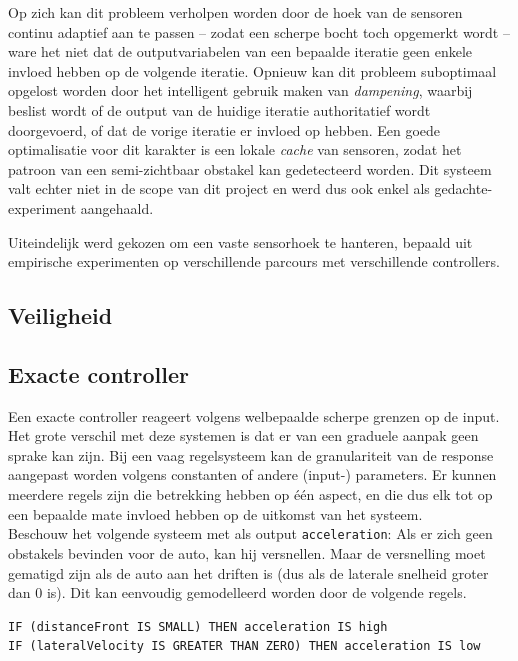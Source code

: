 \documentclass[10pt,a4paper]{article}
\begin{document}
			Op zich kan dit probleem verholpen worden door de hoek van de sensoren continu adaptief aan te passen -- zodat een scherpe bocht toch opgemerkt wordt -- ware het niet dat de outputvariabelen van een bepaalde iteratie geen enkele invloed hebben op de volgende iteratie. Opnieuw kan dit probleem suboptimaal opgelost worden door het intelligent gebruik maken van \textit{dampening}, waarbij beslist wordt of de output van de huidige iteratie authoritatief wordt doorgevoerd, of dat de vorige iteratie er invloed op hebben. Een goede optimalisatie voor dit karakter is een lokale \textit{cache} van sensoren, zodat het patroon van een semi-zichtbaar obstakel kan gedetecteerd worden. Dit systeem valt echter niet in de scope van dit project en werd dus ook enkel als gedachte-experiment aangehaald.

			Uiteindelijk werd gekozen om een vaste sensorhoek te hanteren, bepaald uit empirische experimenten op verschillende parcours met verschillende controllers.

		\subsection{Veiligheid}

		\subsection{Exacte controller}
			Een exacte controller reageert volgens welbepaalde scherpe grenzen op de input. Het grote verschil met deze systemen is dat er van een graduele aanpak geen sprake kan zijn. Bij een vaag regelsysteem kan de granulariteit van de response aangepast worden volgens constanten of andere (input-) parameters. Er kunnen meerdere regels zijn die betrekking hebben op \'e\'en aspect, en die dus elk tot op een bepaalde mate invloed hebben op de uitkomst van het systeem. \\

			Beschouw het volgende systeem met als output \texttt{acceleration}: Als er zich geen obstakels bevinden voor de auto, kan hij versnellen. Maar de versnelling moet gematigd zijn als de auto aan het driften is (dus als de laterale snelheid groter dan 0 is).
			Dit kan eenvoudig gemodelleerd worden door de volgende regels.

			\begin{lstlisting}
IF (distanceFront IS SMALL) THEN acceleration IS high
IF (lateralVelocity IS GREATER THAN ZERO) THEN acceleration IS low
			\end{lstlisting}
\end{document}
